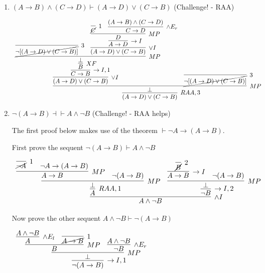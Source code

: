 \documentclass[11pt]{report}
\begin{document}
\begin{enumerate}
\begin{enumerate}
		\newpage
		\item $(A \to  B) \land (C \to D) \vdash (A \rightarrow D) \lor (C \rightarrow B)$ \hfill (Challenge! - RAA)
		
		\hspace{0.2cm}{\bf Solution}

			\begin{center}
				$\begin{array}{c}
					\infer[RAA,3]{(A \to D) \lor (C \to B)}
						{\infer[MP]{\bot}
							{\infer[\lor I]{(A \to D) \lor (C \to B)}
								{\infer[\to I,1]{C \to B}
									{\infer[XF]{B}
										{\infer[MP]{\bot}
											{\infer[3]{\cancel{\lnot[(A \to D) \lor (C \to B)]}}{}
											&
											\infer[\lor I]{(A \to D) \lor (C \to B)}
												{\infer[\to I]{A \to D}
													{\infer[MP]{D}
														{\infer[1]{\cancel{C}}{}
														&
														\infer[\land E_{r}]{C \to D}{(A \to B) \land (C \to D)}}}}}}}}
							&
							\infer[3]{\cancel{\lnot[(A \to D) \lor (C \to B)]}}{}}}
				\end{array}$
			\end{center}
		
		\item $\lnot (A \to  B) \dashv\vdash  A \land \lnot B$ \hfill (Challenge! - RAA helps)
		
		\hspace{0.2cm}{\bf Solution}

		The first proof below makes use of the theorem $\vdash \lnot A \to (A \to B)$.

		First prove the sequent $\lnot ( A \to  B) \vdash  A \land \lnot B$
		\begin{center}
			$\begin{array}{c}
				\infer[\land I]{A \land \lnot B}
					{\infer[RAA,1]{A}
						{\infer[MP]{\bot}
							{\infer[MP]{A \to B}
								{\infer[1]{\cancel{\lnot A}}{}
								&
								\lnot A \to (A \to B)}
							&
							\lnot(A \to B)}}
					&
					\infer[\to I,2]{\lnot B}
						{\infer[MP]{\bot}
							{\infer[\to I]{A \to B}
								{\infer[2]{\cancel{B}}{}}
							&
							\lnot(A \to B)}}}
			\end{array}$
		\end{center}

		Now prove the other sequent $A \land \lnot B \vdash \lnot ( A \to  B)$

		\begin{mdframed}
			\begin{center}
				$\begin{array}{c}
					\infer[\to I,1]{\lnot(A \to B)}
						{\infer[MP]{\bot}
							{\infer[MP]{B}
								{\infer[\land E_{l}]{A}{A \land \lnot B}
								&
								\infer[1]{\cancel{A \to B}}{}}
							&
							\infer[\land E_{r}]{\lnot B}
								{A \land \lnot B}}}
				\end{array}$
			\end{center}
		\end{mdframed}			


\end{enumerate}
\end{enumerate}
\end{document}
